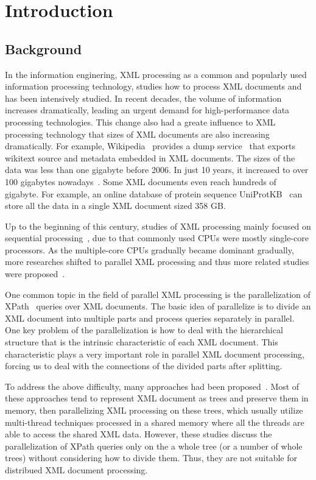 
\chapter{Introduction}

\section{Background}

In the information enginering, XML processing as a common and popularly used
information processing technology, studies how to process XML documents and has
been intensively studied. In recent decades, the volume of information increases
dramatically, leading  an urgent demand for high-performance data processing
technologies. This change also had a greate influence to XML  processing
technology that sizes of XML documents are also increasing dramatically. For
example, Wikipedia~\cite{wiki} provides a dump service~\cite{wikipediadump} that
exports wikitext source and metadata embedded in XML documents. The sizes of the
data was less than one gigabyte before 2006. In just 10 years, it increased to
over 100 gigabytes nowadays~\cite{wikisize}. Some XML documents even reach
hundreds of gigabyte. For example, an online database of protein sequence
UniProtKB~\cite{UniProtKB} can store all the data in a single XML document sized
358 GB.

Up to the beginning of this century, studies of XML processing mainly  focused
on sequential processing~\cite{Skil97,AlJYK02,Ne02,ToGr02,HAJR03},  due to that
commonly used CPUs were mostly single-core processors. As the multiple-core CPUs
gradually became dominant gradually,  more researches shifted to parallel XML
processing  and thus more related studies were
proposed~\cite{SAFu05,PaZC08,LFLQ08,ZhPC10}.

One common topic in the field of parallel XML processing is the parallelization
of XPath~\cite{xpath} queries over XML documents. The basic idea of parallelize
is to divide an XML document into multiple parts and process queries separately
in parallel. One key problem of the parallelization is how to deal with the
hierarchical structure that is the intrinsic characteristic of each XML
document. This characteristic plays a very important role in parallel XML
document processing, forcing us to deal with the connections of the divided
parts after splitting. 

To address the above difficulty, many approaches had been proposed~\cite{JLWO03,
	SAFu05,NEMH07,BuLM08,Mats09, ZhPC10,ChLW13,HaMa16}. Most of these approaches
tend to represent XML document as trees and preserve them in memory, then
parallelizing XML processing on these trees, which usually utilize multi-thread
techniques processed in a shared memory where all the threads are able to access
the shared XML data. However, these studies discuss the parallelization of XPath
queries only on the a whole tree (or a number of whole trees) without
considering how to divide them. Thus, they are not suitable for distribued XML
document processing.

